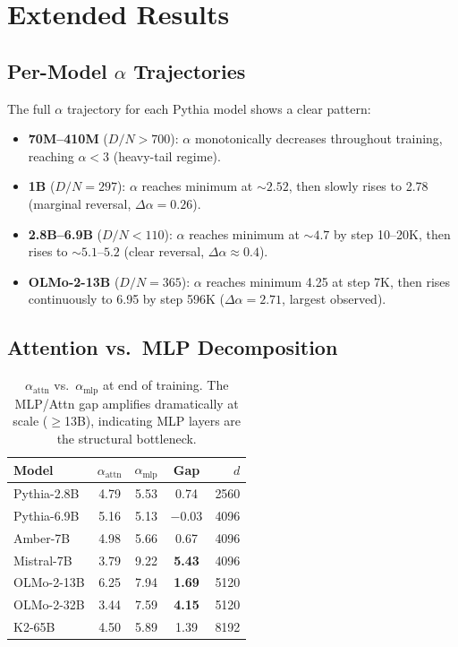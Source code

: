 \section{Extended Results}
\label{app:extended}

\subsection{Per-Model $\alpha$ Trajectories}

The full $\alpha$ trajectory for each Pythia model shows a clear pattern:
\begin{itemize}[leftmargin=*,itemsep=0pt]
    \item \textbf{70M--410M} ($D/N > 700$): $\alpha$ monotonically decreases throughout training, reaching $\alpha < 3$ (heavy-tail regime).
    \item \textbf{1B} ($D/N = 297$): $\alpha$ reaches minimum at ${\sim}2.52$, then slowly rises to 2.78 (marginal reversal, $\Delta\alpha = 0.26$).
    \item \textbf{2.8B--6.9B} ($D/N < 110$): $\alpha$ reaches minimum at ${\sim}4.7$ by step 10--20K, then rises to ${\sim}5.1$--$5.2$ (clear reversal, $\Delta\alpha \approx 0.4$).
    \item \textbf{OLMo-2-13B} ($D/N = 365$): $\alpha$ reaches minimum 4.25 at step 7K, then rises continuously to 6.95 by step 596K ($\Delta\alpha = 2.71$, largest observed).
\end{itemize}

\subsection{Attention vs.\ MLP Decomposition}

\begin{table}[h]
\centering
\small
\caption{$\alpha_{\mathrm{attn}}$ vs.\ $\alpha_{\mathrm{mlp}}$ at end of training. The MLP/Attn gap amplifies dramatically at scale ($\geq$13B), indicating MLP layers are the structural bottleneck.}
\begin{tabular}{@{}lcccr@{}}
\toprule
\textbf{Model} & $\alpha_{\mathrm{attn}}$ & $\alpha_{\mathrm{mlp}}$ & \textbf{Gap} & $d$ \\
\midrule
Pythia-2.8B & 4.79 & 5.53 & 0.74 & 2560 \\
Pythia-6.9B & 5.16 & 5.13 & $-0.03$ & 4096 \\
Amber-7B & 4.98 & 5.66 & 0.67 & 4096 \\
Mistral-7B & 3.79 & 9.22 & \textbf{5.43} & 4096 \\
OLMo-2-13B & 6.25 & 7.94 & \textbf{1.69} & 5120 \\
OLMo-2-32B & 3.44 & 7.59 & \textbf{4.15} & 5120 \\
K2-65B & 4.50 & 5.89 & 1.39 & 8192 \\
\bottomrule
\end{tabular}
\end{table}

